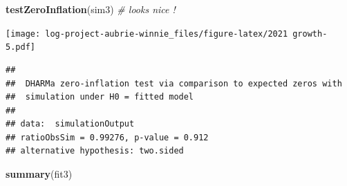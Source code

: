 \documentclass[
]{article}
\newenvironment{Shaded}{\begin{snugshade}}{\end{snugshade}}
\newcommand{\CommentTok}[1]{\textcolor[rgb]{0.56,0.35,0.01}{\textit{#1}}}
\newcommand{\FunctionTok}[1]{\textcolor[rgb]{0.13,0.29,0.53}{\textbf{#1}}}
\newcommand{\NormalTok}[1]{#1}
\begin{document}
\begin{Shaded}
\begin{Highlighting}[]
 \FunctionTok{testZeroInflation}\NormalTok{(sim3) }\CommentTok{\# looks nice ! }
\end{Highlighting}
\end{Shaded}

\texttt{[image: log-project-aubrie-winnie\_files/figure-latex/2021 growth-5.pdf]}

\begin{verbatim}
## 
##  DHARMa zero-inflation test via comparison to expected zeros with
##  simulation under H0 = fitted model
## 
## data:  simulationOutput
## ratioObsSim = 0.99276, p-value = 0.912
## alternative hypothesis: two.sided
\end{verbatim}

\begin{Shaded}
\begin{Highlighting}[]
\FunctionTok{summary}\NormalTok{(fit3)}
\end{Highlighting}
\end{Shaded}
\end{document}
